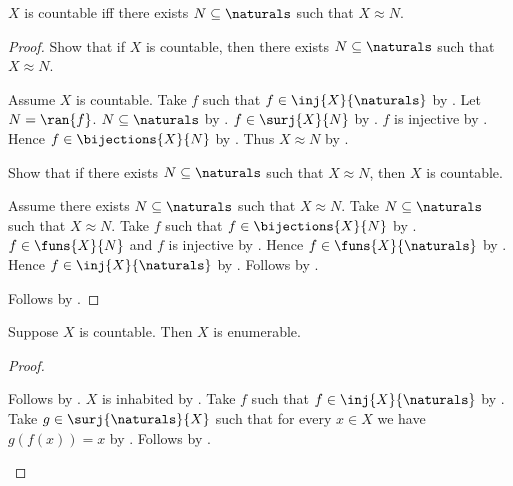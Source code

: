 \begin{theorem}\label{countable_iff_equinumerous_subset_naturals}
    $X$ is countable iff there exists $N\subseteq\naturals$ such that
        $X\approx N$.
\end{theorem}
\begin{proof}
    Show that if $X$ is countable, then there exists
        $N\subseteq\naturals$ such that $X\approx N$.
    \begin{subproof}
        Assume $X$ is countable.
        Take $f$ such that $f\in\inj{X}{\naturals}$ by .
        Let $N=\ran{f}$.
        $N\subseteq\naturals$ by .
        $f\in\surj{X}{N}$ by .
        $f$ is injective
            by .
        Hence $f\in\bijections{X}{N}$
            by .
        Thus $X\approx N$ by .
    \end{subproof}
    Show that if there exists $N\subseteq\naturals$ such that
        $X\approx N$, then $X$ is countable.
    \begin{subproof}
        Assume there exists $N\subseteq\naturals$ such that $X\approx N$.
        Take $N\subseteq\naturals$ such that $X\approx N$.
        Take $f$ such that $f\in\bijections{X}{N}$ by .
        $f\in\funs{X}{N}$ and $f$ is injective
            by .
        Hence $f\in\funs{X}{\naturals}$ by .
        Hence $f\in\inj{X}{\naturals}$
            by .
        Follows by .
    \end{subproof}
    Follows by \auto.
\end{proof}

\begin{theorem}\label{countable_implies_enumerable}
    Suppose $X$ is countable.
    Then $X$ is enumerable.
\end{theorem}
\begin{proof}
    \begin{byCase}
            Follows by .
            $X$ is inhabited by .
            Take $f$ such that $f\in\inj{X}{\naturals}$ by .
            Take $g\in\surj{\naturals}{X}$ such that for every $x\in X$
                we have $g(f(x))=x$
                by .
            Follows by .
    \end{byCase}
\end{proof}

